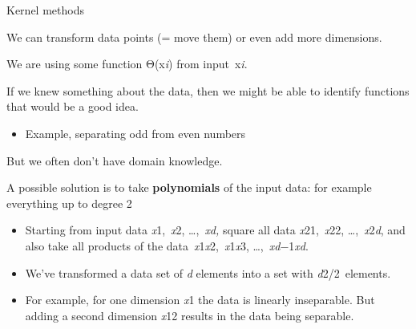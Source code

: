 \documentclass[compress]{beamer}
\begin{document}
\begin{frame}{Kernel methods}

We can transform data points (= move them) or even add more dimensions.

We are using some function Θ(x\emph{i}) from input~x\emph{i}.

If we knew something about the data, then we might be able to identify
functions that would be a good idea.

\begin{itemize}

\item
  Example, separating odd from even numbers
\end{itemize}

But we often don't have domain knowledge.

A possible solution is to take \textbf{polynomials} of the input data:
for example everything up to degree 2

\begin{itemize}

\item
  Starting from input data \emph{x}1,~\emph{x}2, \ldots{},~\emph{xd,}
  square all data \emph{x}21,~\emph{x}22, \ldots{},~\emph{x}2\emph{d},
  and also take all products of the
  data~\emph{x}1\emph{x}2,~\emph{x}1\emph{x}3,
  \ldots{},~\emph{xd}−1\emph{xd}.~
\item
  We've transformed a data set of \emph{d} elements into a set with
  \emph{d}2/2~elements.
\end{itemize}



\begin{itemize}

\item
  For example, for one dimension \emph{x}1 the data is linearly
  inseparable. But adding a second dimension \emph{x}12 results in the
  data being separable.
\end{itemize}

\end{frame}
\end{document}
